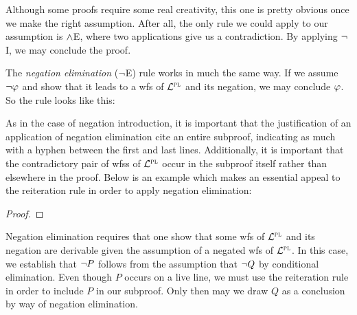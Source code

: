 Although some proofs require some real creativity, this one is pretty obvious once we make the right assumption.
After all, the only rule we could apply to our assumption is $\wedge$E, where two applications give us a contradiction.
By applying $\neg$I, we may conclude the proof.

The \textit{negation elimination} ($\neg$E) rule works in much the same way.
If we assume $\neg\varphi$ and show that it leads to a wfs of $\mathcal{L}^{\textsc{pl}}$ and its negation, we may conclude $\varphi$.
So the rule looks like this:


As in the case of negation introduction, it is important that the justification of an application of negation elimination cite an entire subproof, indicating as much with a hyphen between the first and last lines.
Additionally, it is important that the contradictory pair of wfss of $\mathcal{L}^{\textsc{pl}}$ occur in the subproof itself rather than elsewhere in the proof.
Below is an example which makes an essential appeal to the reiteration rule in order to apply negation elimination:

\begin{proof}
	 \pr{}
	 
	\open
		 
	\close
\end{proof}

Negation elimination requires that one show that some wfs of $\mathcal{L}^{\textsc{pl}}$ and its negation are derivable given the assumption of a negated wfs of $\mathcal{L}^{\textsc{pl}}$.
In this case, we establish that $\neg P$ follows from the assumption that $\neg Q$ by conditional elimination.
Even though $P$ occurs on a live line, we must use the reiteration rule in order to include $P$ in our subproof.
Only then may we draw $Q$ as a conclusion by way of negation elimination. 

